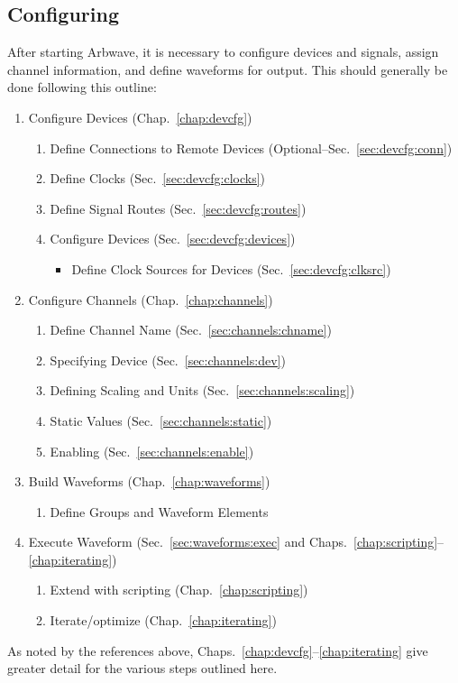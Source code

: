 \subsection{Configuring}
After starting Arbwave, it is necessary to configure devices and signals,
assign channel information, and define waveforms for output.  This should
generally be done following this outline:
%
\begin{enumerate}
  \item Configure Devices (Chap.~\ref{chap:devcfg})

    \begin{enumerate}
      \item Define Connections to Remote Devices
           (Optional--Sec.~\ref{sec:devcfg:conn})

      \item Define Clocks (Sec.~\ref{sec:devcfg:clocks})

      \item Define Signal Routes (Sec.~\ref{sec:devcfg:routes})

      \item Configure Devices (Sec.~\ref{sec:devcfg:devices})
        \begin{itemize}
          \item Define Clock Sources for Devices (Sec.~\ref{sec:devcfg:clksrc})
        \end{itemize}

    \end{enumerate}
  \item Configure Channels (Chap.~\ref{chap:channels})
    \begin{enumerate}
      \item Define Channel Name (Sec.~\ref{sec:channels:chname})
      \item Specifying Device (Sec.~\ref{sec:channels:dev})
      \item Defining Scaling and Units (Sec.~\ref{sec:channels:scaling})
      \item Static Values (Sec.~\ref{sec:channels:static})
      \item Enabling (Sec.~\ref{sec:channels:enable})
    \end{enumerate}

  \item Build Waveforms (Chap.~\ref{chap:waveforms})
    \begin{enumerate}
      \item Define Groups and Waveform Elements
    \end{enumerate}
  \item Execute Waveform (Sec.~\ref{sec:waveforms:exec} and
    Chaps.~\ref{chap:scripting}--\ref{chap:iterating})
    \begin{enumerate}
      \item Extend with scripting (Chap.~\ref{chap:scripting})
      \item Iterate/optimize (Chap.~\ref{chap:iterating})
    \end{enumerate}
\end{enumerate}
%
As noted by the references above, Chaps.~\ref{chap:devcfg}--\ref{chap:iterating} give greater detail for the
various steps outlined here.



